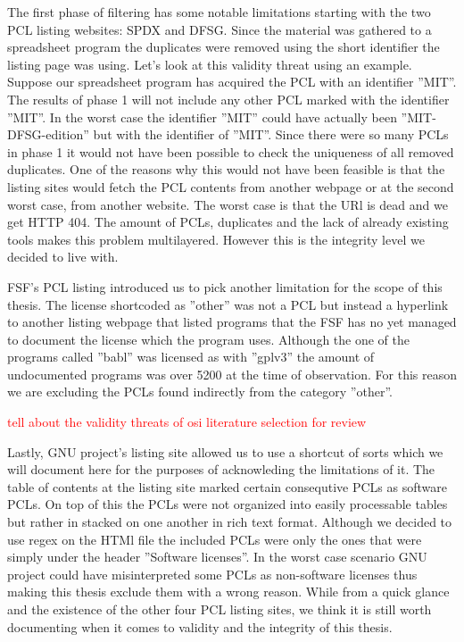 The first phase of filtering has some notable limitations starting with the two PCL listing websites: SPDX and DFSG. Since the material was gathered to a spreadsheet program the duplicates were removed using the short identifier the listing page was using. Let's look at this validity threat using an example. Suppose our spreadsheet program has acquired the PCL with an identifier ''MIT''. The results of phase 1 will not include any other PCL marked with the identifier ''MIT''. In the worst case the identifier ''MIT'' could have actually been ''MIT-DFSG-edition'' but with the identifier of ''MIT''. Since there were so many PCLs in phase 1 it would not have been possible to check the uniqueness of all removed duplicates. One of the reasons why this would not have been feasible is that the listing sites would fetch the PCL contents from another webpage or at the second worst case, from another website. The worst case is that the URl is dead and we get HTTP 404. The amount of PCLs, duplicates and the lack of already existing tools makes this problem multilayered. However this is the integrity level we decided to live with.

FSF's PCL listing introduced us to pick another limitation for the scope of this thesis. The license shortcoded as ''other'' was not a PCL but instead a hyperlink to another listing webpage that listed programs that the FSF has no yet managed to document the license which the program uses. Although the one of the programs called ''babl'' was licensed as with ''gplv3'' the amount of undocumented programs was over 5200 at the time of observation. For this reason we are excluding the PCLs found indirectly from the category ''other''.

\textcolor{red}{tell about the validity threats of osi literature selection for review}

Lastly, GNU project's listing site allowed us to use a shortcut of sorts which we will document here for the purposes of acknowleding the limitations of it. The table of contents at the listing site marked certain consequtive PCLs as software PCLs. On top of this the PCLs were not organized into easily processable tables but rather in stacked on one another in rich text format. Although we decided to use regex on the HTMl file the included PCLs were only the ones that were simply under the header ''Software licenses''. In the worst case scenario GNU project could have misinterpreted some PCLs as non-software licenses thus making this thesis exclude them with a wrong reason. While from a quick glance and the existence of the other four PCL listing sites, we think it is still worth documenting when it comes to validity and the integrity of this thesis.

